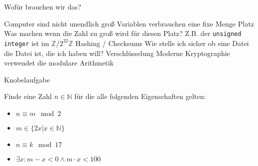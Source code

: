 \begin{frame}{Wofür brauchen wir das?}
    \begin{outline}
        \1 Computer sind nicht unendlich groß
        \2 Variablen verbrauchen eine fixe Menge Platz
        \2 Was machen wenn die Zahl zu groß wird für diesen Platz?
        \2 Z.B. der \texttt{unsigned integer} ist im $\mathbb Z / 2^{32}\mathbb Z$
        \pause
        \1 Hashing / Checksums
        \2 Wie stelle ich sicher ob eine Datei die Datei ist, die ich haben will?
        \pause
        \1 Verschlüsselung
        \2 Moderne Kryptographie verwendet die modulare Arithmetik

    \end{outline}
\end{frame}

{
\begin{frame}[fragile]{Knobelaufgabe}
    \footnotesize
    \begin{block}{Finde eine Zahl $n \in \mathbb N$ für die alle folgenden Eigenschaften gelten:}
        \begin{multicols}{2}
            \begin{itemize}
                \item $n \equiv m \mod 2$
                \item $m \in \{2x | x \in \mathbb N\}$
                \item $n \equiv k \mod 17$
                \item  $\exists x: m-x < 0 \wedge m\cdot x < 100$
            \end{itemize}
        \end{multicols}
    \end{block}

\end{frame}

}
